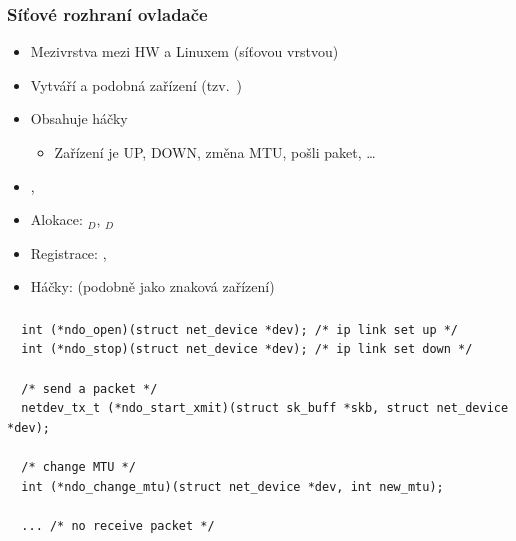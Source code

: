 \begin{frame}
  \frametitle{Síťové rozhraní ovladače}

  \begin{itemize}
    \item Mezivrstva mezi HW a Linuxem (síťovou vrstvou)
    \item Vytváří  a podobná zařízení (tzv.\ )
    \item Obsahuje háčky
    \begin{itemize}
      \item Zařízení je UP, DOWN, změna MTU, pošli paket, \dots
    \end{itemize}
  \end{itemize}

  \pause
  \medskip

  \begin{itemize}
    \item {}, 
    \item Alokace: $_D$, $_D$
    \item Registrace: , 
    \item Háčky:  (podobně jako znaková zařízení)
  \end{itemize}

\end{frame}

\begin{frame}[fragile]
  \frametitle{}

  \begin{block}{}
  \begin{lstlisting}
  int (*ndo_open)(struct net_device *dev); /* ip link set up */
  int (*ndo_stop)(struct net_device *dev); /* ip link set down */

  /* send a packet */
  netdev_tx_t (*ndo_start_xmit)(struct sk_buff *skb, struct net_device *dev);

  /* change MTU */
  int (*ndo_change_mtu)(struct net_device *dev, int new_mtu);

  ... /* no receive packet */
  \end{lstlisting}
  \end{block}

\end{frame}

